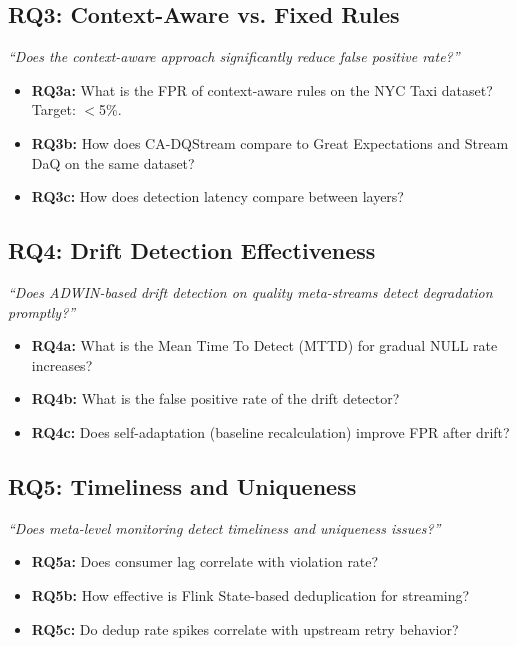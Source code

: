 \subsection{RQ3: Context-Aware vs. Fixed Rules}
\textit{``Does the context-aware approach significantly reduce false positive rate?''}

\begin{itemize}
    \item \textbf{RQ3a:} What is the FPR of context-aware rules on the NYC Taxi dataset? Target: $<$5\%.
    \item \textbf{RQ3b:} How does CA-DQStream compare to Great Expectations and Stream DaQ on the same dataset?
    \item \textbf{RQ3c:} How does detection latency compare between layers?
\end{itemize}

\subsection{RQ4: Drift Detection Effectiveness}
\textit{``Does ADWIN-based drift detection on quality meta-streams detect degradation promptly?''}

\begin{itemize}
    \item \textbf{RQ4a:} What is the Mean Time To Detect (MTTD) for gradual NULL rate increases?
    \item \textbf{RQ4b:} What is the false positive rate of the drift detector?
    \item \textbf{RQ4c:} Does self-adaptation (baseline recalculation) improve FPR after drift?
\end{itemize}

\subsection{RQ5: Timeliness and Uniqueness}
\textit{``Does meta-level monitoring detect timeliness and uniqueness issues?''}

\begin{itemize}
    \item \textbf{RQ5a:} Does consumer lag correlate with violation rate?
    \item \textbf{RQ5b:} How effective is Flink State-based deduplication for streaming?
    \item \textbf{RQ5c:} Do dedup rate spikes correlate with upstream retry behavior?
\end{itemize}

